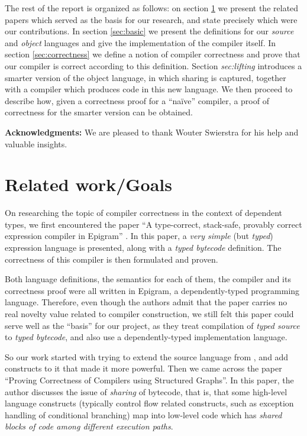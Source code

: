 \documentclass[a4paper]{article}
\begin{document}
        The rest of the report is organized as follows: on section \ref{sec:goals} we present the
        related papers which served as the basis for our research, and state precisely which were
        our contributions. In section \ref{sec:basic} we present the definitions for our 
        \emph{source} and \emph{object} languages and give the implementation of the compiler itself.
        In section \ref{sec:correctness} we define a notion of compiler correctness and prove that our compiler
        is correct according to this definition. Section \emph{sec:lifting} introduces a smarter version of 
        the object language, in which sharing is captured, together with a compiler which
        produces code in this new language. We then proceed to describe how, given a correctness proof for a 
        ``naïve'' compiler, a proof of correctness for the smarter version can be obtained.

        \textbf{Acknowledgments:} We are pleased to thank Wouter Swierstra for his help and valuable insights.
        
    \section{Related work/Goals}
    \label{sec:goals}
        On researching the topic of compiler correctness in the context of dependent types, we first encountered
        the paper ``A type-correct, stack-safe, provably correct expression compiler in Epigram'' \cite{typed-stack-safe-compiler}.
        In this paper, a \emph{very simple} (but \emph{typed}) expression language is presented,
        along with a \emph{typed bytecode} definition. The correctness of this compiler is then formulated and proven.
        
        Both language definitions, the semantics for each of them, the compiler and its correctness proof
        were all written in Epigram, a dependently-typed programming language. Therefore,
        even though the authors admit that the paper carries no real novelty value related to compiler
        construction, we still felt this paper could serve well as the ``basis'' for our project, as they
        treat compilation of \emph{typed source} to \emph{typed bytecode}, and also use a dependently-typed
        implementation language.

        So our work started with trying to extend the source language from \cite{typed-stack-safe-compiler},
        and add constructs to it that made it more powerful. Then we came across the paper
        ``Proving Correctness of Compilers using Structured Graphs''\cite{compiler-correctness-structured-graphs}.
        In this paper, the author discusses the issue of \emph{sharing} of bytecode, that is, that
        some high-level language constructs (typically control flow related constructs,
        such as exception handling of conditional branching) map into low-level code which has
        \emph{shared blocks of code among different execution paths}.
\end{document}
